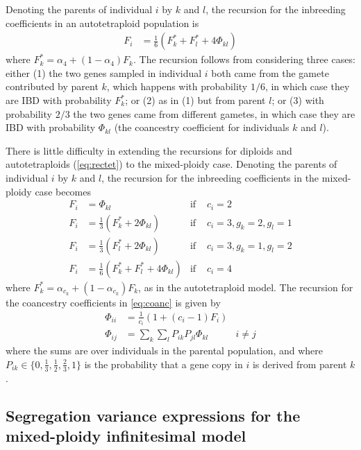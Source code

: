 \documentclass[11pt,a4paper]{article}
\begin{document}
Denoting the parents of individual $i$ by $k$ and $l$, the recursion for the
inbreeding coefficients in an autotetraploid population is
\begin{align}
    F_i &= \frac1 6 (F_k^\ast + F_l^\ast + 4\Phi_{kl}) \label{eq:rectet}
\end{align}
where $F_k^\ast = \alpha_4 + (1-\alpha_4)F_k$.
The recursion follows from considering three cases:
either (1) the two genes sampled in individual $i$ both came from the gamete
contributed by parent $k$, which happens with probability $1/6$, in which case
they are IBD with probability $F_k^\ast$; or (2) as in (1) but from parent $l$; or
(3) with probability $2/3$ the two genes came from different gametes, in which
case they are IBD with probability $\Phi_{kl}$ (the coancestry coefficient for
individuals $k$ and $l$).

There is little difficulty in extending the recursions for diploids
\citep{barton2017} and autotetraploids (\cref{eq:rectet}) to the mixed-ploidy
case. 
Denoting the parents of individual $i$ by $k$ and $l$, the recursion for the
inbreeding coefficients in the mixed-ploidy case becomes
\begin{align}
    F_i &= \Phi_{kl} & \text{if } & c_i = 2 \nonumber \\ 
    F_i &= \frac{1}{3}\left(F_k^\ast + 2\Phi_{kl}\right) & \text{if } 
        & c_i = 3, g_k = 2, g_l = 1 \nonumber \\ 
    F_i &= \frac{1}{3}\left(F_l^\ast + 2\Phi_{kl}\right) & \text{if } 
        & c_i = 3, g_k = 1, g_l = 2 \nonumber \\ 
    F_i &= \frac1 6 (F_k^\ast + F_l^\ast + 4\Phi_{kl}) & \text{if } & c_i = 4
    \label{eq:coanc}
\end{align}
where $F_k^\ast = \alpha_{c_k} + (1-\alpha_{c_k})F_k$, as in the
autotetraploid model.
The recursion for the coancestry coefficients in \cref{eq:coanc} is given by
\begin{align}
    \Phi_{ii} &= \frac{1}{c_{i}} \left(1 + (c_i-1)F_i\right) \nonumber \\
    \Phi_{ij} &= \sum_k \sum_l P_{ik}P_{jl} \Phi_{kl} & i \ne j 
    \label{eq:coancestry}
\end{align}
where the sums are over individuals in the parental population, and where
$P_{ik} \in \{0, \frac1 3, \frac1 2, \frac2 3, 1\}$ is the probability that a
gene copy in $i$ is derived from parent $k$.


\subsection{Segregation variance expressions for the mixed-ploidy infinitesimal 
model \label{sec:segvar}}
\end{document}
